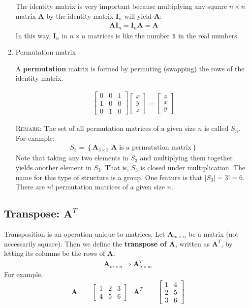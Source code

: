 \documentclass[11pt]{article}
\newcommand{\keyphrase}{\textbf}
\newcommand{\mat}[1]{\mathbf{#1}}
\begin{document}
\begin{enumerate}
{The identity matrix is very important because multiplying any square $n \times n$ matrix $\mat{A}$ by the identity matrix $\mat{I}_n$ will yield $\mat{A}$:
\begin{align*}
\mat{A} \mat{I}_n = \mat{I}_n \mat{A} = \mat{A}
\end{align*}
In this way, $\mat{I}_n$ in $n \times n$ matrices is like the number $\mathbf{1}$ in the real numbers.
}
\item{
Permutation matrix

A \keyphrase{permutation} matrix is formed by permuting (swapping) the rows of the identity matrix.

\begin{align*}
\begin{bmatrix}
0 & 0 & 1 \\
1 & 0 & 0 \\
0 & 1 & 0
\end{bmatrix}
\begin{bmatrix}
x \\ y \\ z
\end{bmatrix}
=
\begin{bmatrix}
z \\ x \\ y
\end{bmatrix}
\end{align*}

\textsc{Remark:} The set of all permutation matrices of a given size $n$ is called $S_n$. For example:
\begin{align*}
S_3 = \left\{ \mat{A}_{3 \times 3} | \text{$\mat{A}$ is a permutation matrix} \right\}
\end{align*}
Note that taking any two elements in $S_3$ and multiplying them together yields another element in $S_3$. That is, $S_3$ is closed under multiplication. The name for this type of structure is a group. One feature is that $|S_3| = 3! = 6$. There are $n!$ permutation matrices of a given size $n$.
}
\end{enumerate}

\subsection*{Transpose: $\mat{A}^T$}

Transposition is an operation unique to matrices. Let $\mat{A}_{m \times n}$ be a matrix (not necessarily square). Then we define the \keyphrase{transpose of $\mat{A}$}, written as $\mat{A}^T$, by letting its columns be the rows of $\mat{A}$.
{\Large\begin{align*}
\mat{A}_{m \times n}
\Rightarrow
\mat{A}^T_{n \times m}
\end{align*}}
For example,
\begin{align*}
\mat{A} &= \begin{bmatrix}
1 & 2 & 3 \\
4 & 5 & 6
\end{bmatrix}
&
\mat{A}^T &= \begin{bmatrix}
1 & 4 \\
2 & 5 \\
3 & 6
\end{bmatrix}
\end{align*}
\end{document}
